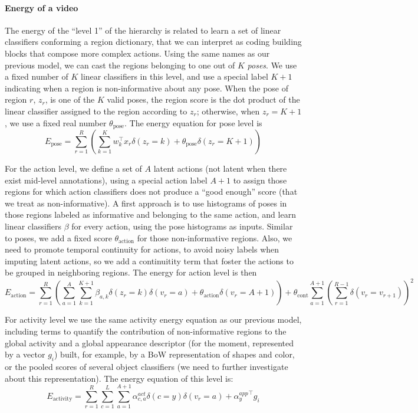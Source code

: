 \documentclass[10pt,letterpaper]{article}
\newcommand{\+}[1]{\ensuremath{{\boldsymbol #1}}}
\begin{document}
\paragraph{Energy of a video}

The energy of the ``level 1'' of the hierarchy is related to learn a set of linear classifiers conforming a region dictionary, that we can interpret as coding building blocks that compose more complex actions. Using the same names as our previous model, we can cast the regions belonging to one out of $K$ \emph{poses}. We use a fixed number of $K$ linear classifiers in this level, and use a special label $K+1$ indicating when a region is non-informative about any pose.  When the pose of region $r$, $z_r$, is one of the $K$ valid poses, the region score is the dot product of the linear classifier assigned to the region according to $z_r$; otherwise, when $z_r=K+1$, we use a fixed real number $\theta_{\text{pose}}$. The energy equation for pose level is
\begin{equation}
E_{\text{pose}} = \sum_{r=1}^R \left( \sum_{k=1}^K w_k^\top x_r \delta(z_r=k) + \theta_{\text{pose}} \delta(z_r = K+1) \right)
\end{equation}

For the action level, we define a set of $A$ latent actions (not latent when there exist mid-level annotations), using a special action label $A+1$ to assign those regions for which action classifiers does not produce a ``good enough'' score (that we treat as non-informative). A first approach is to use histograms of poses in those regions labeled as informative and belonging to the same action, and learn linear classifiers $\beta$ for every action, using the pose histograms as inputs. Similar to poses, we add a fixed score $\theta_{\text{action}}$ for those non-informative regions. Also, we need to promote temporal continuity for actions, to avoid noisy labels when imputing latent actions, so we add a continuitity term that foster the actions to be grouped in neighboring regions. The energy for action level is then
\begin{equation}
E_{\text{action}} = \sum_{r=1}^R  \left( \sum_{a=1}^A \sum_{k=1}^{K+1} \beta_{a,k}\delta(z_r=k)\delta(v_r=a) + \theta_{\text{action}} \delta(v_r = A+1) \right) + \theta_{\text{cont}}\sum_{a=1}^{A+1} \left( \sum_{r=1}^{R-1} \delta(v_r = v_{r+1}) \right)^2
\end{equation}

For activity level we use the same activity energy equation as our previous model, including terms to quantify the contribution of non-informative regions to the global activity and a global appearance descriptor (for the moment, represented by a vector $g_i$) built, for example, by a BoW representation of shapes and color, or the pooled scores of several object classifiers  (we need to further investigate about this representation). The energy equation of this level is:
\begin{equation}
E_{\text{activity}} = \sum_{r=1}^R \sum_{c=1}^L \sum_{a=1}^{A+1} \alpha^{act}_{c,a} \delta(c = y) \delta(v_r = a) + {\alpha^{app}_y}^\top g_i
\end{equation} 
\end{document}
